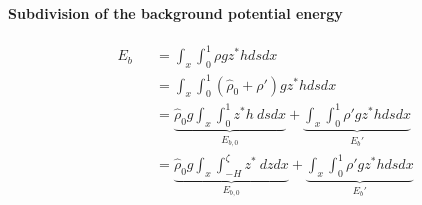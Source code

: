 \paragraph{Subdivision of the background potential energy}
\begin{subequations}
\begin{alignat}{2}
&E_b&& = \int_x \int_0^1 \rho g z^* h ds dx \\
& && = \int_x \int_0^1 ( \hat{\rho}_{0}+\rho') g z^* h ds dx\\
& && = \underbrace{\hat{\rho}_{0} g \int_x \int_0^1 z^* h \ ds dx}_{E_{b,0}} + \underbrace{ \int_x \int_0^1 \rho' g z^* h ds dx}_{E_b'}\\
& && = \underbrace{\hat{\rho}_{0} g \int_x \int_{-H}^{\zeta} z^* \ dz dx}_{E_{b,0}} + \underbrace{ \int_x \int_0^1 \rho' g z^* h ds dx}_{E_b'}
\end{alignat}
\end{subequations}





